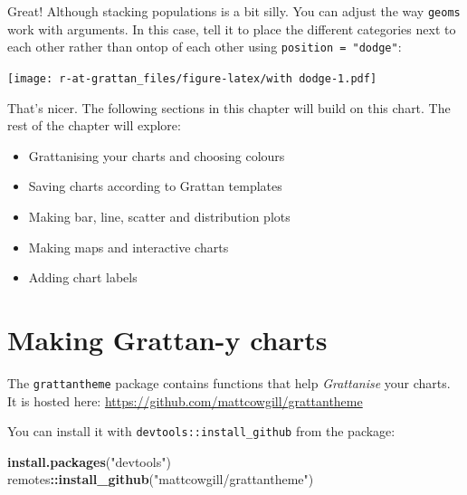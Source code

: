 \documentclass[]{book}
\newenvironment{Shaded}{\begin{snugshade}}{\end{snugshade}}
\newcommand{\DataTypeTok}[1]{\textcolor[rgb]{0.13,0.29,0.53}{#1}}
\newcommand{\KeywordTok}[1]{\textcolor[rgb]{0.13,0.29,0.53}{\textbf{#1}}}
\newcommand{\NormalTok}[1]{#1}
\newcommand{\OperatorTok}[1]{\textcolor[rgb]{0.81,0.36,0.00}{\textbf{#1}}}
\newcommand{\StringTok}[1]{\textcolor[rgb]{0.31,0.60,0.02}{#1}}
\providecommand{\tightlist}{%
  \setlength{\itemsep}{0pt}\setlength{\parskip}{0pt}}
\begin{document}
Great! Although stacking populations is a bit silly. You can adjust the way \texttt{geoms} work with arguments. In this case, tell it to place the different categories next to each other rather than ontop of each other using \texttt{position\ =\ "dodge"}:

\begin{Shaded}
\end{Shaded}

\texttt{[image: r-at-grattan\_files/figure-latex/with dodge-1.pdf]}

That's nicer. The following sections in this chapter will build on this chart. The rest of the chapter will explore:

\begin{itemize}
\tightlist
\item
  Grattanising your charts and choosing colours
\item
  Saving charts according to Grattan templates
\item
  Making bar, line, scatter and distribution plots
\item
  Making maps and interactive charts
\item
  Adding chart labels
\end{itemize}

\hypertarget{making-grattan-y-charts}{%
\section{Making Grattan-y charts}\label{making-grattan-y-charts}}

The \texttt{grattantheme} package contains functions that help \emph{Grattanise} your charts. It is hosted here: \url{https://github.com/mattcowgill/grattantheme}

You can install it with \texttt{devtools::install\_github} from the package:

\begin{Shaded}
\begin{Highlighting}[]
\KeywordTok{install.packages}\NormalTok{(}\StringTok{"devtools"}\NormalTok{)}
\NormalTok{remotes}\OperatorTok{::}\KeywordTok{install_github}\NormalTok{(}\StringTok{"mattcowgill/grattantheme"}\NormalTok{)}
\end{Highlighting}
\end{Shaded}
\end{document}
